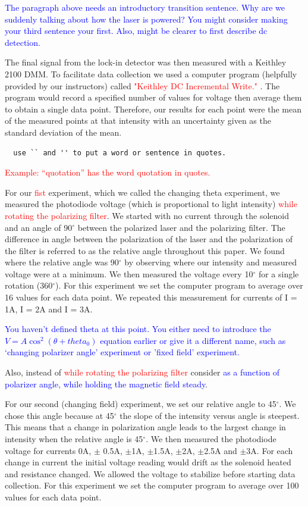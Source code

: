 \documentclass[prb,preprint]{revtex4-1}
\begin{document}
\textcolor{blue}{The paragraph above needs an introductory transition sentence. Why are we suddenly talking about how the laser is powered? You might consider making your third sentence your first. Also, might be clearer to first describe dc detection. }

The final signal from the lock-in detector was then measured with a Keithley 2100 DMM. To facilitate data collection we used a computer program (helpfully provided by our instructors) called \textcolor{red}{"Keithley DC Incremental Write." }.  The program would record a specified number of values for voltage then average them to obtain a single data point. Therefore, our results for each point were the mean of the measured points at that intensity with an uncertainty given as the standard deviation of the mean. 

\begin{verbatim}
  use `` and '' to put a word or sentence in quotes. 
\end{verbatim}
\textcolor{red}{Example: ``quotation'' has the word quotation in quotes. }


For our \textcolor{red}{fist} experiment, which we called the changing theta experiment, we measured the photodiode voltage (which is proportional to light intensity) \textcolor{red}{while rotating the polarizing filter}. We started with no current through the solenoid and an angle of 90$^{\circ}$ between the polarized laser and the polarizing filter. The difference in angle between the polarization of the laser and the polarization of the filter is referred to as the relative angle throughout this paper. We found where the relative angle was 90$^{\circ}$ by observing where our intensity and measured voltage were at a minimum. We then measured the voltage every 10$^{\circ}$ for a single rotation (360$^{\circ}$). For this experiment we set the computer program to average over 16 values for each data point. We repeated this measurement for currents of I = 1A, I = 2A and I = 3A. 

\textcolor{blue}{You haven't defined theta at this point. You either need to introduce the $V = A \cos^{2} (\theta + theta_0)$ equation earlier or give it a different name, such as `changing polarizer angle' experiment or 'fixed field' experiment. }

Also, instead of \textcolor{red}{while rotating the polarizing filter} consider \textcolor{blue}{as a function of polarizer angle, while holding the magnetic field steady}.

For our second (changing field) experiment, we set our relative angle to 45$^{\circ}$. We chose this angle because at 45$^{\circ}$ the slope of the intensity versus angle is steepest. This means that a change in polarization angle leads to the largest change in intensity when the relative angle is 45$^{\circ}$. We then measured the photodiode voltage for currents 0A, $\pm$ 0.5A, $\pm$1A, $\pm$1.5A, $\pm$2A, $\pm$2.5A and $\pm$3A. For each change in current the initial voltage reading would drift as the solenoid heated and resistance changed. We allowed the voltage to stabilize before starting data collection. For this experiment we set the computer program to average over 100 values for each data point.
\end{document}
